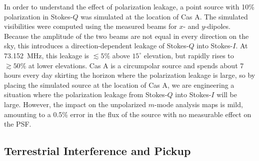 \documentclass[twocolumn]{aastex61}
\begin{document}
In order to understand the effect of polarization leakage, a point source with 10\% polarization in
Stokes-$Q$ was simulated at the location of Cas A.  The simulated visibilities were computed using
the measured beams for $x$- and $y$-dipoles. Because the amplitude of the two beams are not equal in
every direction on the sky, this introduces a direction-dependent leakage of Stokes-$Q$ into
Stokes-$I$. At 73.152~MHz, this leakage is $\lesssim5\%$ above $15^\circ$ elevation, but rapidly
rises to $\gtrsim50\%$ at lower elevations. Cas A is a circumpolar source and spends about 7 hours
every day skirting the horizon where the polarization leakage is large, so by placing the simulated
source at the location of Cas A, we are engineering a situation where the polarization leakage from
Stokes-$Q$ into Stokes-$I$ will be large. However, the impact on the unpolarized $m$-mode analysis
maps is mild, amounting to a 0.5\% error in the flux of the source with no measurable effect on the
PSF.

\subsection{Terrestrial Interference and Pickup}\label{sec:rfi}
\end{document}
